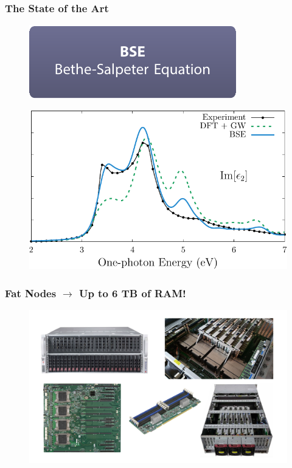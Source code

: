 \documentclass{beamer}
\begin{document}
\begin{frame}
\frametitle{The State of the Art}
\begin{figure}
\centering
\includegraphics[height=0.2\textheight]{diag-methods_future}
\end{figure}
\begin{figure}
\centering
\includegraphics[height=0.55\textheight]{fig-mbpt03}
\end{figure}
\end{frame}

\begin{frame}
\frametitle{Fat Nodes $\rightarrow$ Up to 6 TB of RAM!}
\vspace{-0.5cm}
\begin{figure}
\centering
\includegraphics[width=1.01\textwidth]{image-fats}
\end{figure}
\end{frame}
\end{document}
